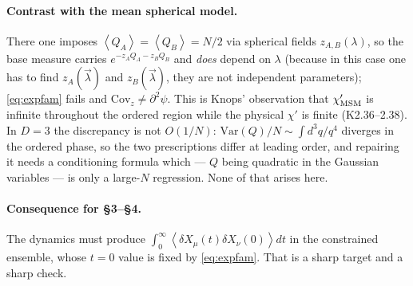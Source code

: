 \documentclass[11pt,a4paper]{article}
\newcommand{\bk}{\vec k}
\newcommand{\bQ}{\vec Q}
\newcommand{\avg}[1]{\left\langle #1 \right\rangle}
\newcommand{\FLAG}[1]{\textcolor{blue}{\textbf{[#1]}}}
\newcommand{\bk}{\vec k}
\newcommand{\bQ}{\vec Q}
\newcommand{\avg}[1]{\left\langle #1 \right\rangle}
\newcommand{\FLAG}[1]{\textcolor{blue}{\textbf{[#1]}}}
\begin{document}

\paragraph{Contrast with the mean spherical model.} There one imposes
$\avg{Q_A}=\avg{Q_B}=N/2$ via spherical fields $z_{A,B}(\lambda)$, so the base measure
carries $e^{-z_AQ_A-z_BQ_B}$ and \emph{does} depend on $\lambda$ (because in this case one has to find $z_A(\vec \lambda)$ and $z_B(\vec \lambda)$, they are not independent parameters); \eqref{eq:expfam} fails
and $\mathrm{Cov}_z\neq\partial^2\psi$. This is Knops' observation that $\chi'_{\rm MSM}$ is
infinite throughout the ordered region while the physical $\chi'$ is finite
(K2.36--2.38). In $D=3$ the discrepancy is not $O(1/N)$: $\mathrm{Var}(Q)/N\sim\int d^3q/q^4$
diverges in the ordered phase, so the two prescriptions differ at leading order, and
repairing it needs a conditioning formula which --- $Q$ being quadratic in the Gaussian
variables --- is only a large-$N$ regression. None of that arises here.

\paragraph{Consequence for \S3--\S4.} The dynamics must produce
$\int_0^\infty\avg{\delta X_\mu(t)\delta X_\nu(0)}dt$ in the constrained ensemble, whose
$t=0$ value is fixed by \eqref{eq:expfam}. That is a sharp target and a sharp check.
\end{document}
